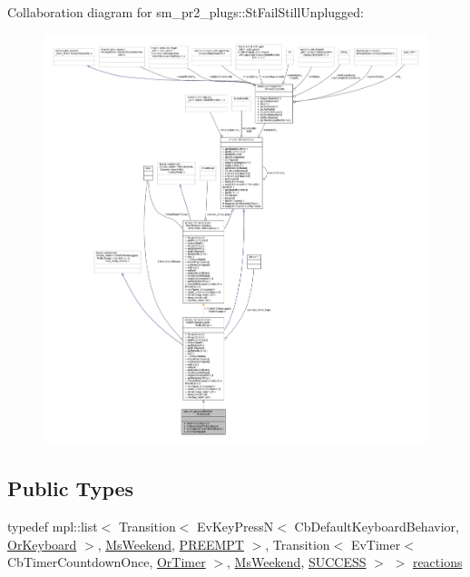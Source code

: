 Collaboration diagram for sm\+\_\+pr2\+\_\+plugs\+:\+:St\+Fail\+Still\+Unplugged\+:
\nopagebreak
\begin{figure}[H]
\begin{center}
\leavevmode
\includegraphics[width=350pt]{structsm__pr2__plugs_1_1StFailStillUnplugged__coll__graph}
\end{center}
\end{figure}
\subsection*{Public Types}
\begin{DoxyCompactItemize}
\item 
typedef mpl\+::list$<$ Transition$<$ Ev\+Key\+PressN$<$ Cb\+Default\+Keyboard\+Behavior, \hyperlink{classsm__pr2__plugs_1_1OrKeyboard}{Or\+Keyboard} $>$, \hyperlink{classsm__pr2__plugs_1_1MsWeekend}{Ms\+Weekend}, \hyperlink{classPREEMPT}{P\+R\+E\+E\+M\+PT} $>$, Transition$<$ Ev\+Timer$<$ Cb\+Timer\+Countdown\+Once, \hyperlink{classsm__pr2__plugs_1_1OrTimer}{Or\+Timer} $>$, \hyperlink{classsm__pr2__plugs_1_1MsWeekend}{Ms\+Weekend}, \hyperlink{classSUCCESS}{S\+U\+C\+C\+E\+SS} $>$ $>$ \hyperlink{structsm__pr2__plugs_1_1StFailStillUnplugged_a9c9ae3c078efa50be9683fa32a7bd60e}{reactions}
\end{DoxyCompactItemize}
